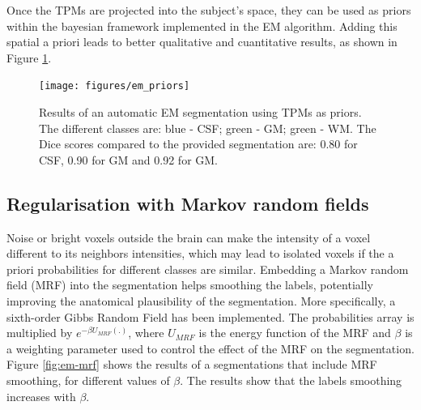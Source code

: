 

Once the TPMs are projected into the subject's space, they can be used as priors within the bayesian framework implemented in the EM algorithm. Adding this spatial a priori leads to better qualitative and cuantitative results, as shown in Figure \ref{fig:em-priors}.

\begin{figure}
  \centering
  \texttt{[image: figures/em\_priors]}
  \caption{Results of an automatic EM segmentation using TPMs as priors. The different classes are: blue - CSF; green - GM; green - WM. The Dice scores compared to the provided segmentation are: 0.80 for CSF, 0.90 for GM and 0.92 for GM.}
  \label{fig:em-priors}
\end{figure}



\subsection{Regularisation with Markov random fields}


Noise or bright voxels outside the brain can make the intensity of a voxel different to its neighbors intensities, which may lead to isolated voxels if the a priori probabilities for different classes are similar. Embedding a Markov random field (MRF) into the segmentation helps smoothing the labels, potentially improving the anatomical plausibility of the segmentation. More specifically, a sixth-order Gibbs Random Field has been implemented. The probabilities array is multiplied by $e^{- \beta U_{MRF}(.)}$, where $U_{MRF}$ is the energy function of the MRF and $\beta$ is a weighting parameter used to control the effect of the MRF on the segmentation. Figure \ref{fig:em-mrf} shows the results of a segmentations that include MRF smoothing, for different values of $\beta$. The results show that the labels smoothing increases with $\beta$.



